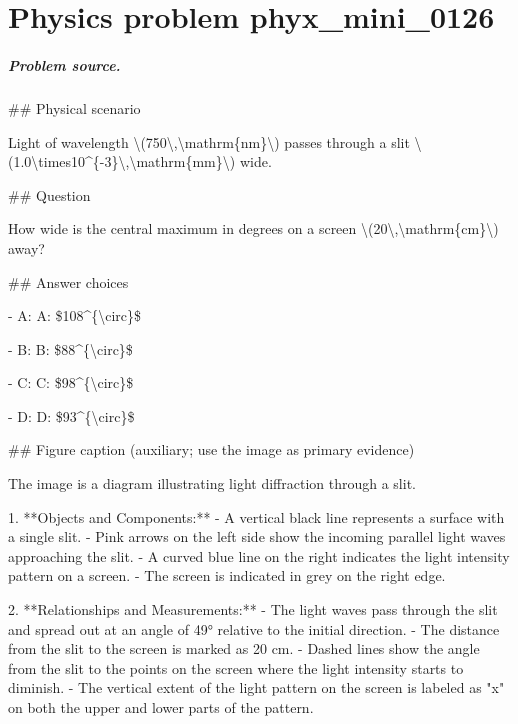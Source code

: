
\chapter{Physics problem phyx\_mini\_0126}
\label{ch:PhyXMiniProblems_problem_phyx_mini_0126}

\paragraph{Problem source.}
\#\# Physical scenario

Light of wavelength \textbackslash{}(750\textbackslash{},\textbackslash{}mathrm\{nm\}\textbackslash{}) passes through a slit \textbackslash{}(1.0\textbackslash{}times10\textasciicircum{}\{-3\}\textbackslash{},\textbackslash{}mathrm\{mm\}\textbackslash{}) wide.

\#\# Question

How wide is the central maximum in degrees on a screen \textbackslash{}(20\textbackslash{},\textbackslash{}mathrm\{cm\}\textbackslash{}) away?

\#\# Answer choices

- A: A: \$108\textasciicircum{}\{\textbackslash{}circ\}\$

- B: B: \$88\textasciicircum{}\{\textbackslash{}circ\}\$

- C: C: \$98\textasciicircum{}\{\textbackslash{}circ\}\$

- D: D: \$93\textasciicircum{}\{\textbackslash{}circ\}\$

\#\# Figure caption (auxiliary; use the image as primary evidence)

The image is a diagram illustrating light diffraction through a slit. 

1. **Objects and Components:**
   - A vertical black line represents a surface with a single slit.
   - Pink arrows on the left side show the incoming parallel light waves approaching the slit.
   - A curved blue line on the right indicates the light intensity pattern on a screen.
   - The screen is indicated in grey on the right edge.

2. **Relationships and Measurements:**
   - The light waves pass through the slit and spread out at an angle of 49° relative to the initial direction.
   - The distance from the slit to the screen is marked as 20 cm.
   - Dashed lines show the angle from the slit to the points on the screen where the light intensity starts to diminish.
   - The vertical extent of the light pattern on the screen is labeled as "x" on both the upper and lower parts of the pattern.

